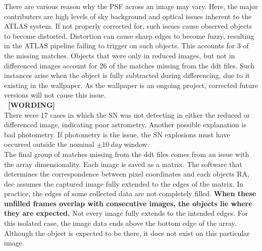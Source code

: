 %
%
\indent There are various reason why the PSF across an image may vary.
Here, the major contributers are high levels of sky background and optical 
issues inherent to the ATLAS system. 
If not properly corrected for, such issues cause observed objects to become distorted. 
Distortion can cause sharp edges to become fuzzy, resulting in the ATLAS pipeline 
failing to trigger on such objects. This accounts for 3 of the missing matches.
Objects that were only in reduced images, but not in differenced images account 
for 26 of the matches missing from the ddt files. Such instances arise when the 
object is fully subtracted during differencing, due to it existing in the wallpaper.
As the wallpaper is an ongoing project, corrected future versions will not cause this issue.\\
{\bf ~[WORDING]}\\
%
%
\indent There were 17 cases in which the SN was not detecting in either the reduced or 
differenced image, indicating poor astrometry. Another possible explanation is 
bad photometry. If photometry is the issue, the SN explosions must have occurred 
outside the nominal $\pm10~day$ window.\\
%
%
\indent The final group of matches missing from the ddt files comes from an issue with 
the array dimensionality. Each image is saved as a matrix. The software that 
determines the correspondence between pixel coordinates and each objects RA, dec 
assumes the captured image fully extended to the edges of the matrix.
In practice, the edges of some collected data are not completely filled. 
{\bf When these unfilled frames overlap with consecutive images, the objects lie where they are expected.} 
Not every image fully extends to the intended edges. 
For this isolated case, the 
image data ends above the bottom edge of the array. Although the object is expected 
to be there, it does not exist on this particular image.


